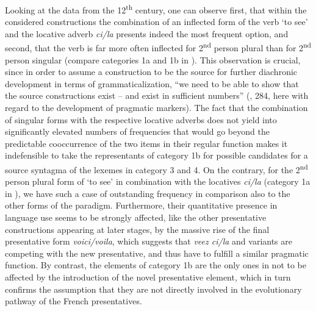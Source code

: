\documentclass[output=paper]{langscibook}
\begin{document}
\begin{itemize}
\begin{itemize}
\begin{itemize}
\begin{itemize}
\begin{itemize}
\begin{itemize}
\begin{itemize}
Looking at the data from the 12\textsuperscript{th} century, one can observe first, that within the considered constructions the combination of an inflected form of the verb ‘to see’ and the locative adverb \textit{ci/la} presents indeed the most frequent option, and second, that the verb is far more often inflected for 2\textsuperscript{nd} person plural than for 2\textsuperscript{nd} person singular (compare categories 1a and 1b in ). This observation is crucial, since in order to assume a construction to be the source for further diachronic development in terms of grammaticalization, “we need to be able to show that the source constructions exist – and exist in sufficient numbers” (\citealt{Brinton2017}, 284, here with regard to the development of pragmatic markers). The fact that the combination of singular forms with the respective locative adverbs does not yield into significantly elevated numbers of frequencies that would go beyond the predictable cooccurrence of the two items in their regular function makes it indefensible to take the representants of category 1b for possible candidates for a source syntagma of the lexemes in category 3 and 4. On the contrary, for the 2\textsuperscript{nd} person plural form of ‘to see’ in combination with the locatives \textit{ci/la} (category 1a in ), we have such a case of outstanding frequency in comparison also to the other forms of the paradigm. Furthermore, their quantitative presence in language use seems to be strongly affected, like the other presentative constructions appearing at later stages, by the massive rise of the final presentative form \textit{voici/voila}, which suggests that \textit{veez ci/la} and variants are competing with the new presentative, and thus have to fulfill a similar pragmatic function. By contrast, the elements of category 1b are the only ones in  not to be affected by the introduction of the novel presentative element, which in turn confirms the assumption that they are not directly involved in the evolutionary pathway of the French presentatives. 


\end{itemize}
\end{itemize}
\end{itemize}
\end{itemize}
\end{itemize}
\end{itemize}
\end{itemize}
\end{document}
